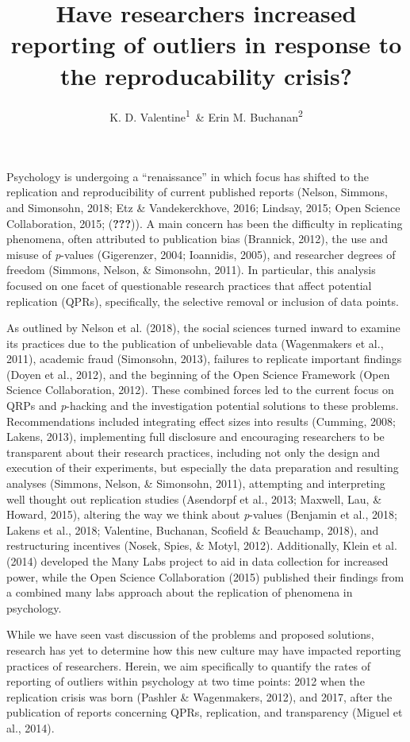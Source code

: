 \documentclass[english,man]{apa6}
\title{Have researchers increased reporting of outliers in response to the
reproducability crisis?}
\author{K. D. Valentine\textsuperscript{1}~\& Erin M. Buchanan\textsuperscript{2}}
\affiliation{
    \vspace{0.5cm}
          \textsuperscript{1} University of Missouri\\
          \textsuperscript{2} Missouri State University  }
\theoremstyle{definition}
\theoremstyle{definition}
\theoremstyle{definition}
\theoremstyle{remark}
\begin{document}
\maketitle

\setcounter{secnumdepth}{0}



Psychology is undergoing a \enquote{renaissance} in which focus has
shifted to the replication and reproducibility of current published
reports (Nelson, Simmons, and Simonsohn, 2018; Etz \& Vandekerckhove,
2016; Lindsay, 2015; Open Science Collaboration, 2015;
({\textbf{???}})). A main concern has been the difficulty in replicating
phenomena, often attributed to publication bias (Brannick, 2012), the
use and misuse of \emph{p}-values (Gigerenzer, 2004; Ioannidis, 2005),
and researcher degrees of freedom (Simmons, Nelson, \& Simonsohn, 2011).
In particular, this analysis focused on one facet of questionable
research practices that affect potential replication (QPRs),
specifically, the selective removal or inclusion of data points.

As outlined by Nelson et al. (2018), the social sciences turned inward
to examine its practices due to the publication of unbelievable data
(Wagenmakers et al., 2011), academic fraud (Simonsohn, 2013), failures
to replicate important findings (Doyen et al., 2012), and the beginning
of the Open Science Framework (Open Science Collaboration, 2012). These
combined forces led to the current focus on QRPs and \emph{p}-hacking
and the investigation potential solutions to these problems.
Recommendations included integrating effect sizes into results (Cumming,
2008; Lakens, 2013), implementing full disclosure and encouraging
researchers to be transparent about their research practices, including
not only the design and execution of their experiments, but especially
the data preparation and resulting analyses (Simmons, Nelson, \&
Simonsohn, 2011), attempting and interpreting well thought out
replication studies (Asendorpf et al., 2013; Maxwell, Lau, \& Howard,
2015), altering the way we think about \emph{p}-values (Benjamin et al.,
2018; Lakens et al., 2018; Valentine, Buchanan, Scofield \& Beauchamp,
2018), and restructuring incentives (Nosek, Spies, \& Motyl, 2012).
Additionally, Klein et al. (2014) developed the Many Labs project to aid
in data collection for increased power, while the Open Science
Collaboration (2015) published their findings from a combined many labs
approach about the replication of phenomena in psychology.

While we have seen vast discussion of the problems and proposed
solutions, research has yet to determine how this new culture may have
impacted reporting practices of researchers. Herein, we aim specifically
to quantify the rates of reporting of outliers within psychology at two
time points: 2012 when the replication crisis was born (Pashler \&
Wagenmakers, 2012), and 2017, after the publication of reports
concerning QPRs, replication, and transparency (Miguel et al., 2014).
\end{document}
